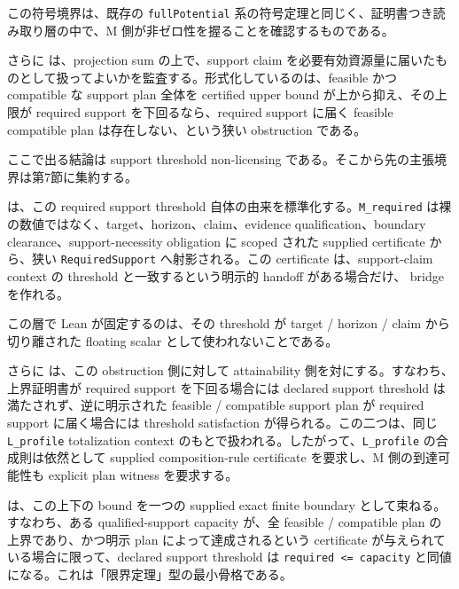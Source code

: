 \documentclass[12pt,a4paper]{article}
\begin{document}
この符号境界は、既存の \texttt{fullPotential} 系の符号定理と同じく、証明書つき読み取り層の中で、M 側が非ゼロ性を握ることを確認するものである。

さらに {\scriptsize{}} は、projection sum の上で、support claim を必要有効資源量に届いたものとして扱ってよいかを監査する。形式化しているのは、feasible かつ compatible な support plan 全体を certified upper bound が上から抑え、その上限が required support を下回るなら、required support に届く feasible compatible plan は存在しない、という狭い obstruction である。

ここで出る結論は support threshold non-licensing である。そこから先の主張境界は第7節に集約する。

{\scriptsize{}} は、この required support threshold 自体の由来を標準化する。\texttt{M\_required} は裸の数値ではなく、target、horizon、claim、evidence qualification、boundary clearance、support-necessity obligation に scoped された supplied certificate から、狭い \texttt{RequiredSupport} へ射影される。この certificate は、support-claim context の threshold と一致するという明示的 handoff がある場合だけ、{\scriptsize{}} bridge を作れる。

この層で Lean が固定するのは、その threshold が target / horizon / claim から切り離された floating scalar として使われないことである。

さらに {\scriptsize{}} は、この obstruction 側に対して attainability 側を対にする。すなわち、上界証明書が required support を下回る場合には declared support threshold は満たされず、逆に明示された feasible / compatible support plan が required support に届く場合には threshold satisfaction が得られる。この二つは、同じ \texttt{L\_profile} totalization context のもとで扱われる。したがって、\texttt{L\_profile} の合成則は依然として supplied composition-rule certificate を要求し、M 側の到達可能性も explicit plan witness を要求する。

{\scriptsize{}} は、この上下の bound を一つの supplied exact finite boundary として束ねる。すなわち、ある qualified-support capacity が、全 feasible / compatible plan の上界であり、かつ明示 plan によって達成されるという certificate が与えられている場合に限って、declared support threshold は \texttt{required\ \textless{}=\ capacity} と同値になる。これは「限界定理」型の最小骨格である。
\end{document}
